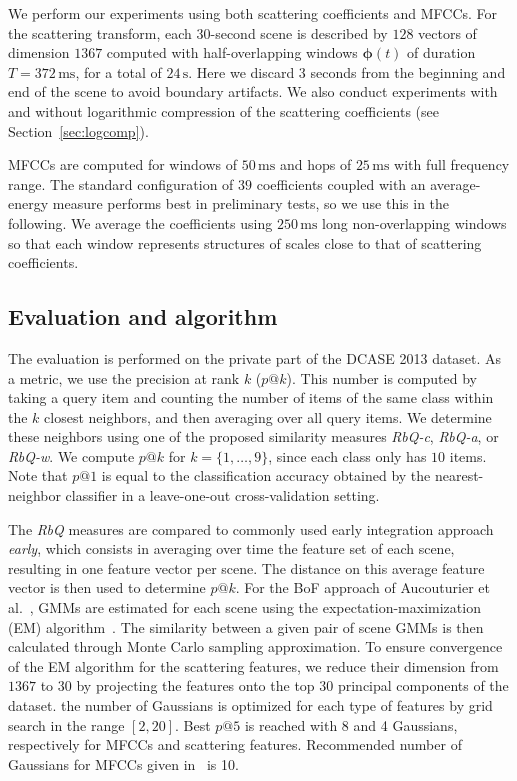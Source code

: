 \documentclass[smallextended]{svjour3}
\begin{document}
We perform our experiments using both scattering coefficients and MFCCs. For the scattering transform, each $30$-second scene is described by $128$ vectors of dimension $1367$ computed with half-overlapping windows $\boldsymbol{\phi}(t)$ of duration $T=372\,\mathrm{ms}$, for a total of $24\,\mathrm{s}$. Here we discard $3$ seconds from the beginning and end of the scene to avoid boundary artifacts. We also conduct experiments with and without logarithmic compression of the scattering coefficients (see Section~\ref{sec:logcomp}).

MFCCs are computed for windows of $50\,\mathrm{ms}$ and hops of $25\,\mathrm{ms}$ with full frequency range. The standard configuration of $39$ coefficients coupled with an average-energy measure performs best in preliminary tests, so we use this in the following. We average the coefficients using $250\,\mathrm{ms}$ long non-overlapping windows so that each window represents structures of scales close to that of scattering coefficients.

\subsection{Evaluation and algorithm}

The evaluation is performed on the private part of the DCASE 2013 dataset. As a metric, we use the precision at rank $k$ ($p@k$). This number is computed by taking a query item and counting the number of items of the same class within the $k$ closest neighbors, and then averaging over all query items. We determine these neighbors using one of the proposed similarity measures \emph{RbQ-c}, \emph{RbQ-a}, or \emph{RbQ-w}. We compute $p@k$ for $k=\lbrace 1,\ldots,9\rbrace$, since each class only has $10$ items. Note that $p@1$ is equal to the classification accuracy obtained by the nearest-neighbor classifier in a leave-one-out cross-validation setting.

The \emph{RbQ} measures are compared to commonly used early integration approach \emph{early}, which consists in averaging over time the feature set of each scene, resulting in one feature vector per scene. The distance on this average feature vector is then used to determine $p@k$. For the BoF approach of Aucouturier et al.~\cite{aucouturier2007bag}, GMMs are estimated for each scene using the expectation-maximization (EM) algorithm~\cite{dempster-laird, moon1996expectation}. The similarity between a given pair of scene GMMs is then calculated through Monte Carlo sampling approximation. To ensure convergence of the EM algorithm for the scattering features, we reduce their dimension from $1367$ to $30$ by projecting the features onto the top $30$ principal components of the dataset. the number of Gaussians is optimized for each type of features by grid search in the range $[2, 20]$. Best $p@5$ is reached with 8 and 4  Gaussians, respectively for MFCCs and scattering features. Recommended number of Gaussians for MFCCs given in~\cite{aucouturier2007bag} is 10.
\end{document}
